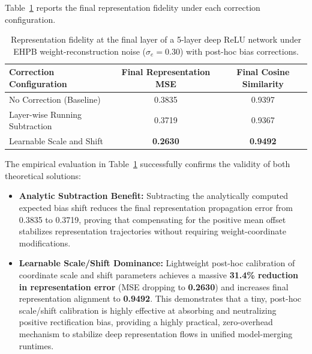 Table~\ref{tab:relu_bias_correction} reports the final representation fidelity under each correction configuration.

\begin{table}[h]
\caption{Representation fidelity at the final layer of a 5-layer deep ReLU network under EHPB weight-reconstruction noise ($\sigma_e = 0.30$) with post-hoc bias corrections.}
\label{tab:relu_bias_correction}
\vskip 0.15in
\begin{center}
\begin{small}
\begin{sc}
\begin{tabular}{lcc}
\toprule
Correction Configuration & Final Representation MSE & Final Cosine Similarity \\
\midrule
No Correction (Baseline) & 0.3835 & 0.9397 \\
Layer-wise Running Subtraction & 0.3719 & 0.9367 \\
Learnable Scale and Shift & \textbf{0.2630} & \textbf{0.9492} \\
\bottomrule
\end{tabular}
\end{sc}
\end{small}
\end{center}
\vskip -0.1in
\end{table}

The empirical evaluation in Table~\ref{tab:relu_bias_correction} successfully confirms the validity of both theoretical solutions:
\begin{itemize}
    \item \textbf{Analytic Subtraction Benefit:} Subtracting the analytically computed expected bias shift reduces the final representation propagation error from 0.3835 to 0.3719, proving that compensating for the positive mean offset stabilizes representation trajectories without requiring weight-coordinate modifications.
    \item \textbf{Learnable Scale/Shift Dominance:} Lightweight post-hoc calibration of coordinate scale and shift parameters achieves a massive \textbf{31.4\% reduction in representation error} (MSE dropping to \textbf{0.2630}) and increases final representation alignment to \textbf{0.9492}. This demonstrates that a tiny, post-hoc scale/shift calibration is highly effective at absorbing and neutralizing positive rectification bias, providing a highly practical, zero-overhead mechanism to stabilize deep representation flows in unified model-merging runtimes.
\end{itemize}